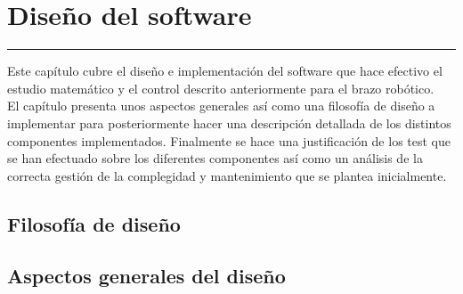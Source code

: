 \chapter{Diseño del software} \label{chap:SW}
\hrule
\vspace{3mm}

Este capítulo cubre el diseño e implementación del software que hace efectivo el estudio matemático y el control descrito anteriormente para el brazo robótico.
\\
El capítulo presenta unos aspectos generales así como una filosofía de diseño a implementar para posteriormente hacer una descripción detallada de los distintos componentes implementados. Finalmente se hace una justificación de los test que se han efectuado sobre los diferentes componentes así como un análisis de la correcta gestión de la complegidad y mantenimiento que se plantea inicialmente.

\section{Filosofía de diseño} \label{sec:SW:filosofia_diseño}


\section{Aspectos generales del diseño} \label{sec:SW:diseño_general}

